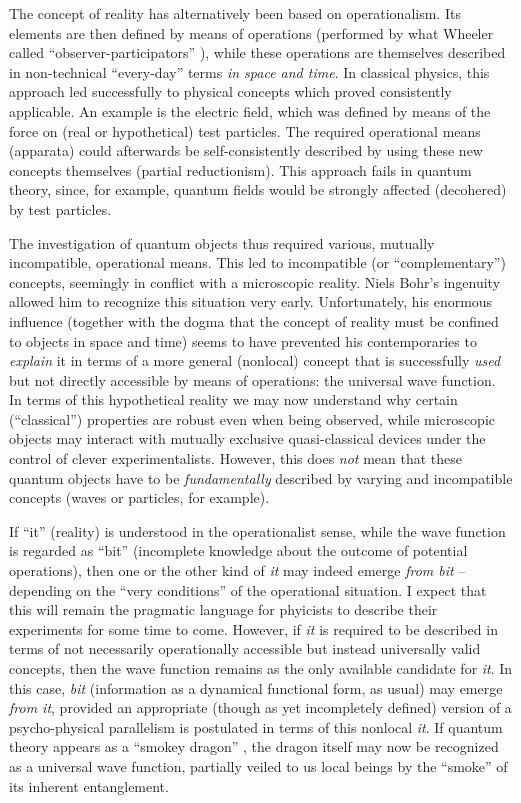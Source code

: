 The concept of reality has alternatively been based on operationalism.
Its elements are then defined by means of operations (performed by what
Wheeler called ``observer-participators'' \cite{frontiers}), while
these operations are themselves described in non-technical
``every-day'' terms {\it in space and time}. In classical physics,
this approach led successfully to physical concepts which proved
consistently applicable. An example is the electric field, which was
defined by means of the force on (real or hypothetical) test
particles. The required operational means (apparata) could afterwards
be self-consistently described by using these new concepts
themselves (partial reductionism). This approach fails in quantum
theory, since, for example, quantum fields would be strongly affected
(decohered) by test particles.

The investigation of quantum objects thus required various, mutually
incompatible, operational means. This led to
incompatible (or ``complementary'') concepts, seemingly in
conflict with a microscopic reality.
Niels Bohr's ingenuity allowed him to recognize this situation very
early. Unfortunately, his enormous influence (together with the dogma
that the concept of reality must be confined to objects in space and
time) seems to have prevented his contemporaries to {\it explain} it in
terms of a more general (nonlocal) concept that is successfully {\it
used} but  not directly accessible by means of operations: the
universal wave function. In terms of this hypothetical reality  we may
now understand  why certain (``classical'') properties are robust even
when being observed, while microscopic objects may interact with
mutually exclusive quasi-classical devices under the control of clever
experimentalists. However, this does {\it not} mean that these quantum
objects have to be {\it fundamentally} described by varying and
incompatible concepts (waves or particles, for example).

If ``it'' (reality) is understood in the operationalist sense, while
the wave function is regarded as ``bit'' (incomplete knowledge
about the outcome of potential operations), then
one or the other kind of {\it it} may indeed emerge {\it from bit}
-- depending on the ``very conditions'' of the operational situation.
I expect that this will remain the pragmatic language  for
phyicists to describe their experiments for some time to come. However,
if {\it it} is required to be described in terms of  not necessarily
operationally accessible but instead universally valid concepts, then
the wave function remains as the only available candidate for {\it
it}. In this case, {\it bit} (information as a dynamical functional
form, as usual) may emerge {\it from it}, provided an appropriate
(though as yet incompletely defined) version of a psycho-physical
parallelism is postulated in terms of this nonlocal {\it it}.  If
quantum theory appears as a ``smokey dragon'' \cite{frontiers}, the
dragon itself may now be recognized as a universal wave function,
partially veiled to us local beings by the ``smoke'' of its inherent
entanglement.

